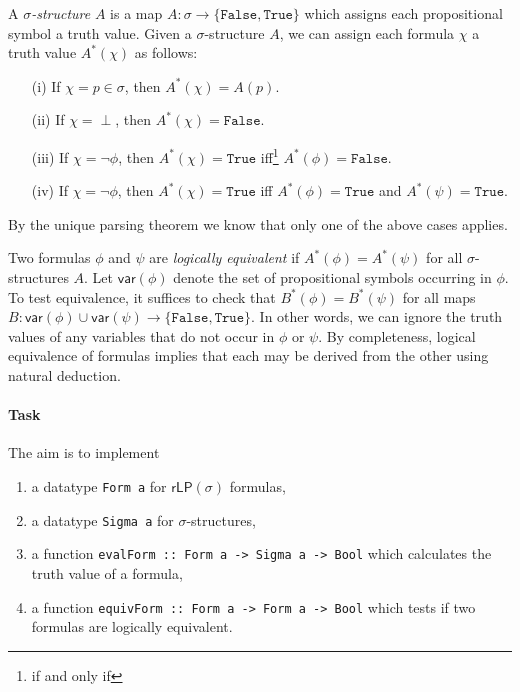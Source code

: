 \documentclass{article}[12pt]
\theoremstyle{definition}
\newcommand{\true}{\mathtt{True}}
\newcommand{\false}{\mathtt{False}}
\begin{document}
A \emph{$\sigma$-structure} $A$ is a map $A : \sigma \to \{\false , \true \}$ which assigns each propositional symbol a truth value. Given a $\sigma$-structure $A$, we can assign each formula $\chi$ a truth value $A^*(\chi)$ as follows:
\begin{itemize}
    \item[(i)] If $\chi = p \in \sigma$, then $A^*(\chi) = A(p)$.
    \item[(ii)] If $\chi = \perp$, then $A^*(\chi) = \false$.
    \item[(iii)] If $\chi = \neg \phi$, then $A^*(\chi) = \true$ iff\footnote{if and only if} $A^*(\phi) = \false$.
    \item[(iv)] If $\chi = \neg \phi$, then $A^*(\chi) = \true$ iff $A^*(\phi) = \true$ and $A^*(\psi) = \true$.
\end{itemize}
By the unique parsing theorem we know that only one of the above cases applies.

Two formulas $\phi$ and $\psi$ are \emph{logically equivalent} if $A^*(\phi) = A^*(\psi)$ for all $\sigma$-structures $A$. Let $\mathsf{var}(\phi)$ denote the set of propositional symbols occurring in $\phi$. To test equivalence, it suffices to check that $B^*(\phi) = B^*(\psi)$ for all maps $B : \mathsf{var}(\phi) \cup \mathsf{var}(\psi) \to \{\false,\true \}$. In other words, we can ignore the truth values of any variables that do not occur in $\phi$ or $\psi$. By completeness, logical equivalence of formulas implies that each may be derived from the other using natural deduction.

\paragraph{Task} The aim is to implement 
\begin{enumerate}
    \item a datatype \verb|Form a| for $\mathsf{rLP}(\sigma)$ formulas, 
    \item a datatype \verb|Sigma a| for $\sigma$-structures,
    \item a function \verb|evalForm :: Form a -> Sigma a -> Bool| which calculates the truth value of a formula,
    \item a function \verb|equivForm :: Form a -> Form a -> Bool| which tests if two formulas are logically equivalent. 
\end{enumerate}
\end{document}
